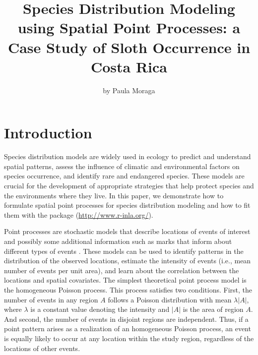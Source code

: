 \title{Species Distribution Modeling using Spatial Point Processes: a Case Study of Sloth Occurrence in Costa Rica}
\author{by Paula Moraga}

\maketitle



  
\section{Introduction}

Species distribution models are widely used in ecology to predict and understand spatial patterns, assess the influence of climatic and environmental factors on species occurrence, and identify rare and endangered species.
These models are crucial for the development of appropriate strategies that help protect species and the environments where they live.
In this paper, we demonstrate how to formulate spatial point processes for species distribution modeling and how to fit them with the  package \citep{rueetal09} (\url{http://www.r-inla.org/}).

Point processes are stochastic models that describe locations of events of interest and possibly some additional information such as marks that inform about different types of events \citep{diggle13, moragaandmontes11}.
These models can be used to identify patterns in the distribution of the observed locations, estimate the intensity of events (i.e., mean number of events per unit area), and learn about the correlation between the locations and spatial covariates.
The simplest theoretical point process model is the homogeneous Poisson process. This process satisfies two conditions.
First, the number of events in any region $A$ follows a Poisson distribution with mean $\lambda |A|$, where $\lambda$ is a constant value denoting the intensity and $|A|$ is the area of region $A$. And second, the number of events in disjoint regions are independent.
Thus, if a point pattern arises as a realization of an homogeneous Poisson process, an event is equally likely to occur at any location within the study region, regardless of the locations of other events.



